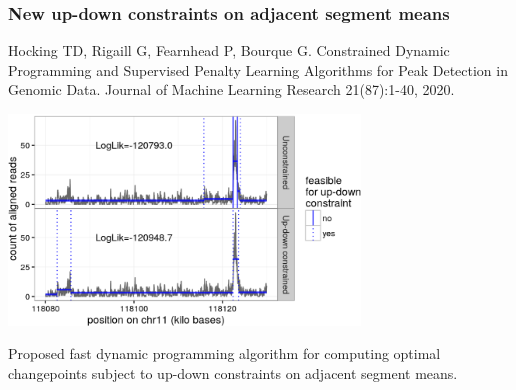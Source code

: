 \documentclass[t]{beamer}
\begin{document}
\begin{frame}
  \frametitle{New up-down constraints on adjacent segment means}
{\scriptsize Hocking TD, Rigaill G, Fearnhead P, Bourque G. Constrained Dynamic Programming and Supervised Penalty Learning Algorithms for Peak Detection in Genomic Data. Journal of Machine Learning Research 21(87):1-40, 2020.}

  \includegraphics[width=0.7\textwidth]{figure-Hocking2020-peak-constraints}

  Proposed fast dynamic programming algorithm for computing optimal
  changepoints subject to up-down constraints on adjacent segment
  means.
\end{frame}
\end{document}
